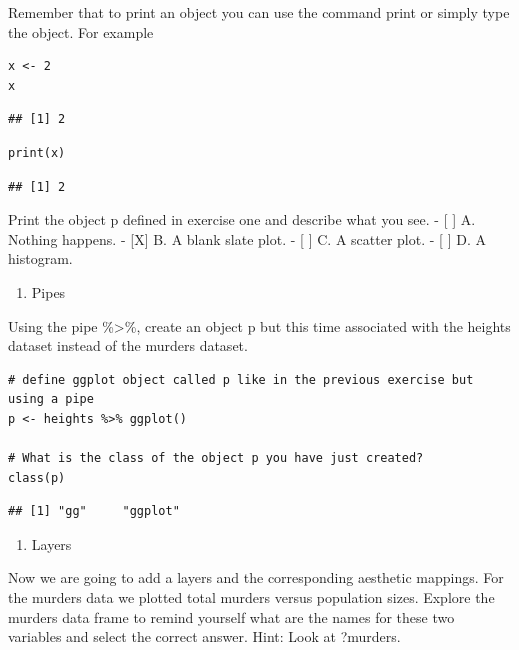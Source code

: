 \documentclass[
]{article}
\providecommand{\tightlist}{%
  \setlength{\itemsep}{0pt}\setlength{\parskip}{0pt}}
\begin{document}
Remember that to print an object you can use the command print or simply
type the object. For example

\begin{verbatim}
x <- 2
x
\end{verbatim}

\begin{verbatim}
## [1] 2
\end{verbatim}

\begin{verbatim}
print(x)
\end{verbatim}

\begin{verbatim}
## [1] 2
\end{verbatim}

Print the object p defined in exercise one and describe what you see. -
{[} {]} A. Nothing happens. - {[}X{]} B. A blank slate plot. - {[} {]}
C. A scatter plot. - {[} {]} D. A histogram.

\begin{enumerate}
\def\labelenumi{\arabic{enumi}.}
\setcounter{enumi}{2}
\tightlist
\item
  Pipes
\end{enumerate}

Using the pipe \%\textgreater\%, create an object p but this time
associated with the heights dataset instead of the murders dataset.

\begin{verbatim}
# define ggplot object called p like in the previous exercise but using a pipe 
p <- heights %>% ggplot()

# What is the class of the object p you have just created?
class(p)
\end{verbatim}

\begin{verbatim}
## [1] "gg"     "ggplot"
\end{verbatim}

\begin{enumerate}
\def\labelenumi{\arabic{enumi}.}
\setcounter{enumi}{3}
\tightlist
\item
  Layers
\end{enumerate}

Now we are going to add a layers and the corresponding aesthetic
mappings. For the murders data we plotted total murders versus
population sizes. Explore the murders data frame to remind yourself what
are the names for these two variables and select the correct answer.
Hint: Look at ?murders.
\end{document}
